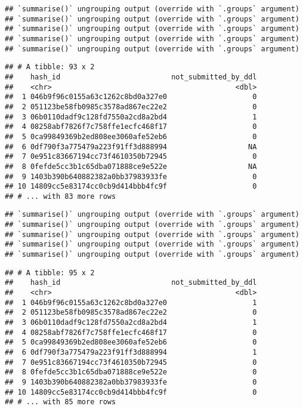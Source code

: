 \documentclass[
]{article}
\begin{document}
\begin{verbatim}
## `summarise()` ungrouping output (override with `.groups` argument)
## `summarise()` ungrouping output (override with `.groups` argument)
## `summarise()` ungrouping output (override with `.groups` argument)
## `summarise()` ungrouping output (override with `.groups` argument)
## `summarise()` ungrouping output (override with `.groups` argument)
\end{verbatim}

\begin{verbatim}
## # A tibble: 93 x 2
##    hash_id                          not_submitted_by_ddl
##    <chr>                                           <dbl>
##  1 046b9f96c0155a63c1262c8bd0a327e0                    0
##  2 051123be58fb0985c3578ad867ec22e2                    0
##  3 06b0110dadf9c128fd7550a2cd8a2bd4                    1
##  4 08258abf7826f7c758ffe1ecfc468f17                    0
##  5 0ca99849369b2ed808ee3060afe52eb6                    0
##  6 0df790f3a775479a223f91ff3d888994                   NA
##  7 0e951c83667194cc73f4610350b72945                    0
##  8 0fefde5cc3b1c65dba071888ce9e522e                   NA
##  9 1403b390b640882382a0bb37983933fe                    0
## 10 14809cc5e83174cc0cb9d414bbb4fc9f                    0
## # ... with 83 more rows
\end{verbatim}

\begin{verbatim}
## `summarise()` ungrouping output (override with `.groups` argument)
## `summarise()` ungrouping output (override with `.groups` argument)
## `summarise()` ungrouping output (override with `.groups` argument)
## `summarise()` ungrouping output (override with `.groups` argument)
## `summarise()` ungrouping output (override with `.groups` argument)
\end{verbatim}

\begin{verbatim}
## # A tibble: 95 x 2
##    hash_id                          not_submitted_by_ddl
##    <chr>                                           <dbl>
##  1 046b9f96c0155a63c1262c8bd0a327e0                    1
##  2 051123be58fb0985c3578ad867ec22e2                    0
##  3 06b0110dadf9c128fd7550a2cd8a2bd4                    1
##  4 08258abf7826f7c758ffe1ecfc468f17                    0
##  5 0ca99849369b2ed808ee3060afe52eb6                    0
##  6 0df790f3a775479a223f91ff3d888994                    1
##  7 0e951c83667194cc73f4610350b72945                    0
##  8 0fefde5cc3b1c65dba071888ce9e522e                    0
##  9 1403b390b640882382a0bb37983933fe                    0
## 10 14809cc5e83174cc0cb9d414bbb4fc9f                    0
## # ... with 85 more rows
\end{verbatim}
\end{document}
